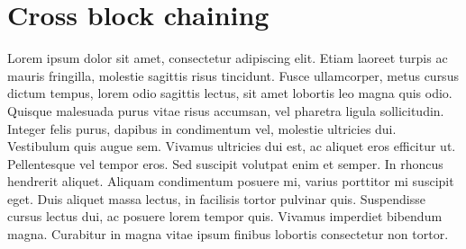 \documentclass[conference]{IEEEtran}
\begin{document}
%



\section{Cross block chaining}

Lorem ipsum dolor sit amet, consectetur adipiscing elit. Etiam laoreet turpis ac mauris fringilla, molestie sagittis risus tincidunt. Fusce ullamcorper, metus cursus dictum tempus, lorem odio sagittis lectus, sit amet lobortis leo magna quis odio. Quisque malesuada purus vitae risus accumsan, vel pharetra ligula sollicitudin. Integer felis purus, dapibus in condimentum vel, molestie ultricies dui. Vestibulum quis augue sem. Vivamus ultricies dui est, ac aliquet eros efficitur ut. Pellentesque vel tempor eros. Sed suscipit volutpat enim et semper. In rhoncus hendrerit aliquet. Aliquam condimentum posuere mi, varius porttitor mi suscipit eget. Duis aliquet massa lectus, in facilisis tortor pulvinar quis. Suspendisse cursus lectus dui, ac posuere lorem tempor quis. Vivamus imperdiet bibendum magna. Curabitur in magna vitae ipsum finibus lobortis consectetur non tortor.
\end{document}
